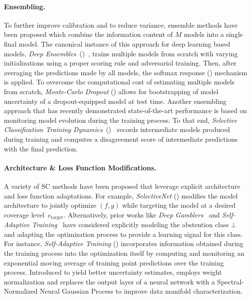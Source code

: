 \paragraph{Ensembling.}
To further improve calibration and to reduce variance, ensemble methods have been proposed which combine the information content of $M$ models into a single final model. The canonical instance of this approach for deep learning based models, \emph{Deep Ensembles}~(\de)~\citep{lakshminarayanan2017simple}, trains multiple models from scratch with varying initializations using a proper scoring rule and adversarial training. Then, after averaging the predictions made by all models, the softmax response (\sr) mechanism is applied. To overcome the computational cost of estimating multiple models from scratch, \emph{Monte-Carlo Dropout} (\mcdo) \citep{gal2016dropout} allows for bootstrapping of model uncertainty of a dropout-equipped model at test time. Another ensembling approach that has recently demonstrated state-of-the-art \selc performance is based on monitoring model evolution during the training process. To that end, \emph{Selective Classification Training Dynamics}~(\sctd)~\citep{rabanser2022selective} records intermediate models produced during training and computes a disagreement score of intermediate predictions with the final prediction. 

\paragraph{Architecture \& Loss Function Modifications.} 
A variety of SC methods have been proposed that leverage explicit architecture and loss function adaptations. For example, \emph{SelectiveNet} (\sn) \citep{geifman2019selectivenet} modifies the model architecture to jointly optimize $(f,g)$ while targeting the model at a desired coverage level~$c_\text{target}$. Alternatively, prior works like \emph{Deep Gamblers}~\citep{liu2019deep} and \emph{Self-Adaptive Training}~\citep{huang2020self} have considered explicitly modeling the abstention class $\bot$ and adapting the optimization process to provide a learning signal for this class. For instance, \emph{Self-Adaptive Training} (\sat) incorporates information obtained during the training process into the optimization itself by computing and monitoring an exponential moving average of training point predictions over the training process. Introduced to yield better uncertainty estimates, \citet{liu2020simple} employs weight normalization and replaces the output layer of a neural network with a Spectral-Normalized Neural Gaussian Process to improve data manifold characterization. 

